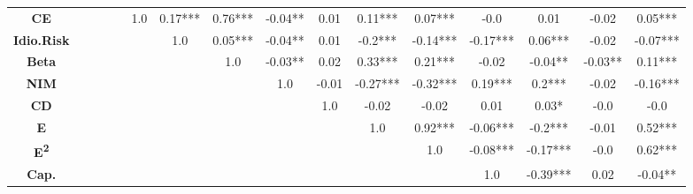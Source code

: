 \documentclass[11pt, a4paper]{article}
\begin{document}
\begin{landscape}
\begin{table}[htbp]
{\begin{tabular}{cccccccccccccccc}
\textbf{CE} &  &  &  &  & \textcolor{cor-very-strong}{1.0} & \textcolor{cor-very-weak}{0.17***} & \textcolor{cor-strong}{0.76***} & \textcolor{cor-very-weak}{-0.04**} & \textcolor{cor-very-weak}{0.01} & \textcolor{cor-very-weak}{0.11***} & \textcolor{cor-very-weak}{0.07***} & \textcolor{cor-very-weak}{-0.0} & \textcolor{cor-very-weak}{0.01} & \textcolor{cor-very-weak}{-0.02} & \textcolor{cor-very-weak}{0.05***}\\
\textbf{Idio.Risk} &  &  &  &  &  & \textcolor{cor-very-strong}{1.0} & \textcolor{cor-very-weak}{0.05***} & \textcolor{cor-very-weak}{-0.04**} & \textcolor{cor-very-weak}{0.01} & \textcolor{cor-very-weak}{-0.2***} & \textcolor{cor-very-weak}{-0.14***} & \textcolor{cor-very-weak}{-0.17***} & \textcolor{cor-very-weak}{0.06***} & \textcolor{cor-very-weak}{-0.02} & \textcolor{cor-very-weak}{-0.07***}\\
\textbf{Beta} &  &  &  &  &  &  & \textcolor{cor-very-strong}{1.0} & \textcolor{cor-very-weak}{-0.03**} & \textcolor{cor-very-weak}{0.02} & \textcolor{cor-weak}{0.33***} & \textcolor{cor-weak}{0.21***} & \textcolor{cor-very-weak}{-0.02} & \textcolor{cor-very-weak}{-0.04**} & \textcolor{cor-very-weak}{-0.03**} & \textcolor{cor-very-weak}{0.11***}\\
\textbf{NIM} &  &  &  &  &  &  &  & \textcolor{cor-very-strong}{1.0} & \textcolor{cor-very-weak}{-0.01} & \textcolor{cor-very-weak}{-0.27***} & \textcolor{cor-very-weak}{-0.32***} & \textcolor{cor-very-weak}{0.19***} & \textcolor{cor-weak}{0.2***} & \textcolor{cor-very-weak}{-0.02} & \textcolor{cor-very-weak}{-0.16***}\\
\textbf{CD} &  &  &  &  &  &  &  &  & \textcolor{cor-very-strong}{1.0} & \textcolor{cor-very-weak}{-0.02} & \textcolor{cor-very-weak}{-0.02} & \textcolor{cor-very-weak}{0.01} & \textcolor{cor-very-weak}{0.03*} & \textcolor{cor-very-weak}{-0.0} & \textcolor{cor-very-weak}{-0.0}\\
\textbf{E} &  &  &  &  &  &  &  &  &  & \textcolor{cor-very-strong}{1.0} & \textcolor{cor-very-strong}{0.92***} & \textcolor{cor-very-weak}{-0.06***} & \textcolor{cor-very-weak}{-0.2***} & \textcolor{cor-very-weak}{-0.01} & \textcolor{cor-moderate}{0.52***}\\
\textbf{E\textsuperscript{2}} &  &  &  &  &  &  &  &  &  &  & \textcolor{cor-very-strong}{1.0} & \textcolor{cor-very-weak}{-0.08***} & \textcolor{cor-very-weak}{-0.17***} & \textcolor{cor-very-weak}{-0.0} & \textcolor{cor-strong}{0.62***}\\
\textbf{Cap.} &  &  &  &  &  &  &  &  &  &  &  & \textcolor{cor-very-strong}{1.0} & \textcolor{cor-very-weak}{-0.39***} & \textcolor{cor-very-weak}{0.02} & \textcolor{cor-very-weak}{-0.04**}\\

\end{tabular}}
\end{table}
\end{landscape}
\end{document}
